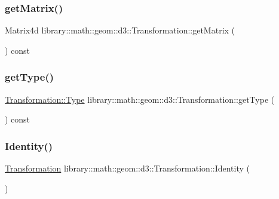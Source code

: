 \subsubsection{\texorpdfstring{get\+Matrix()}{getMatrix()}}
{\footnotesize\ttfamily Matrix4d library\+::math\+::geom\+::d3\+::\+Transformation\+::get\+Matrix (\begin{DoxyParamCaption}{ }\end{DoxyParamCaption}) const}

\mbox{\label{classlibrary_1_1math_1_1geom_1_1d3_1_1_transformation_a719b99d5613e2070007e19364b0ec7ac}} 
\subsubsection{\texorpdfstring{get\+Type()}{getType()}}
{\footnotesize\ttfamily \hyperlink{classlibrary_1_1math_1_1geom_1_1d3_1_1_transformation_a25f1dc99d391174bf82a7132d08b2fc1}{Transformation\+::\+Type} library\+::math\+::geom\+::d3\+::\+Transformation\+::get\+Type (\begin{DoxyParamCaption}{ }\end{DoxyParamCaption}) const}

\mbox{\label{classlibrary_1_1math_1_1geom_1_1d3_1_1_transformation_a8d5af972dbba51f5746f2248f5164b69}} 
\subsubsection{\texorpdfstring{Identity()}{Identity()}}
{\footnotesize\ttfamily \hyperlink{classlibrary_1_1math_1_1geom_1_1d3_1_1_transformation}{Transformation} library\+::math\+::geom\+::d3\+::\+Transformation\+::\+Identity (\begin{DoxyParamCaption}{ }\end{DoxyParamCaption})\hspace{0.3cm}{\ttfamily [static]}}

